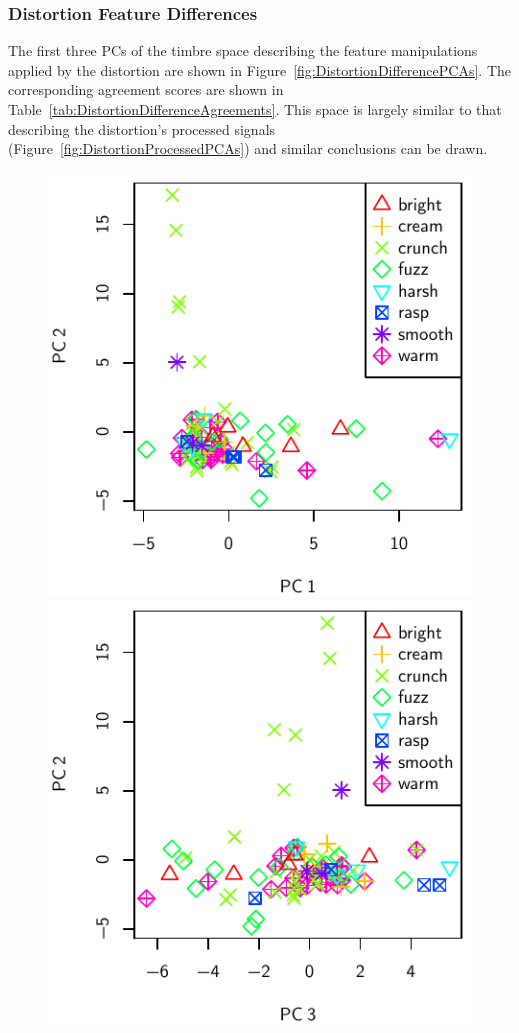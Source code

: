 		\subsubsection*{Distortion Feature Differences}
			The first three PCs of the timbre space describing the feature manipulations applied by the
			distortion are shown in Figure~\ref{fig:DistortionDifferencePCAs}. The corresponding agreement
			scores are shown in Table~\ref{tab:DistortionDifferenceAgreements}. This space is largely similar
			to that describing the distortion's processed signals (Figure~\ref{fig:DistortionProcessedPCAs})
			and similar conclusions can be drawn.

			\begin{figure}[h!]
				\centering
				\subfloat
				{
					\includegraphics{chapter4/Images/DistortionDifferencePCA1-2.pdf}
					\label{fig:DistortionDifferencePCA1-2}
				}
				\quad
				\subfloat
				{
					\includegraphics{chapter4/Images/DistortionDifferencePCA3-2.pdf}
}
\end{figure}
